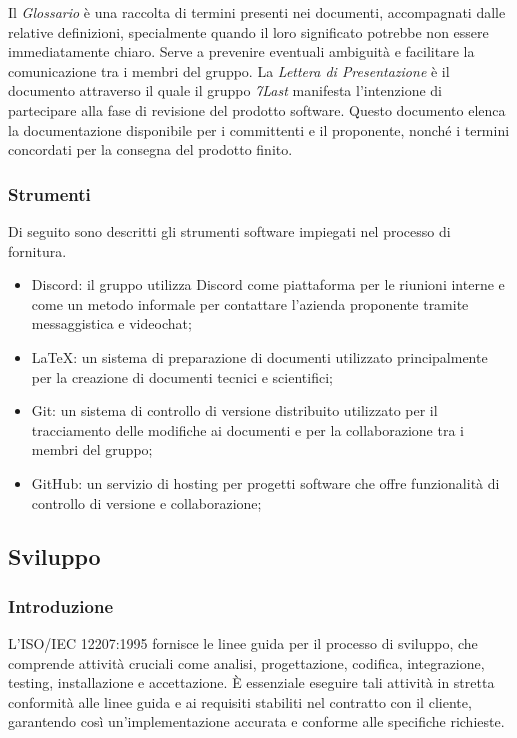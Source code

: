 Il \textit{Glossario} è una raccolta di termini presenti nei documenti, accompagnati dalle relative definizioni, specialmente quando il loro significato potrebbe non essere immediatamente chiaro.
Serve a prevenire eventuali ambiguità e facilitare la comunicazione tra i membri del gruppo.
La \textit{Lettera di Presentazione} è il documento attraverso il quale il gruppo \textit{7Last} manifesta l'intenzione di partecipare alla fase di revisione del prodotto software.
Questo documento elenca la documentazione disponibile per i committenti e il proponente, nonché i termini concordati per la consegna del prodotto finito.

\subsubsection{Strumenti}
Di seguito sono descritti gli strumenti software impiegati nel processo di fornitura.
\begin{itemize}
	\item Discord: il gruppo utilizza Discord come piattaforma per le riunioni interne e come un metodo informale per contattare l'azienda proponente tramite messaggistica e videochat;
	\item LaTeX: un sistema di preparazione di documenti utilizzato principalmente per la creazione di documenti tecnici e scientifici;
	\item Git: un sistema di controllo di versione distribuito utilizzato per il tracciamento delle modifiche ai documenti e per la collaborazione tra i membri del gruppo;
	\item GitHub: un servizio di hosting per progetti software che offre funzionalità di controllo di versione e collaborazione;
\end{itemize}

\subsection{Sviluppo}
\subsubsection{Introduzione}
L'ISO/IEC 12207:1995 fornisce le linee guida per il processo di sviluppo, che comprende attività cruciali come analisi, progettazione, codifica, integrazione, testing, installazione e accettazione.
È essenziale eseguire tali attività in stretta conformità alle linee guida e ai requisiti stabiliti nel contratto con il cliente, garantendo così un'implementazione accurata e conforme alle specifiche richieste.
